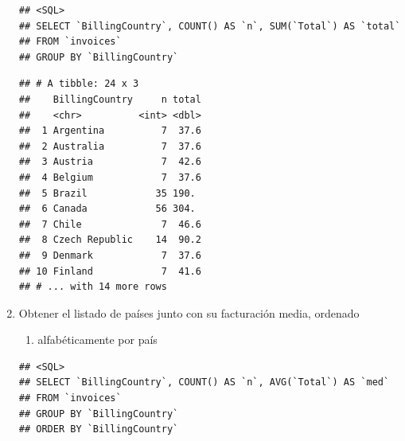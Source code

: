 \documentclass[]{book}
\newenvironment{Shaded}{\begin{snugshade}}{\end{snugshade}}
\newcommand{\KeywordTok}[1]{\textcolor[rgb]{0.13,0.29,0.53}{\textbf{#1}}}
\newcommand{\DataTypeTok}[1]{\textcolor[rgb]{0.13,0.29,0.53}{#1}}
\newcommand{\StringTok}[1]{\textcolor[rgb]{0.31,0.60,0.02}{#1}}
\newcommand{\OtherTok}[1]{\textcolor[rgb]{0.56,0.35,0.01}{#1}}
\newcommand{\OperatorTok}[1]{\textcolor[rgb]{0.81,0.36,0.00}{\textbf{#1}}}
\newcommand{\NormalTok}[1]{#1}
\providecommand{\tightlist}{%
  \setlength{\itemsep}{0pt}\setlength{\parskip}{0pt}}
\begin{document}
\begin{enumerate}
\begin{verbatim}
## <SQL>
## SELECT `BillingCountry`, COUNT() AS `n`, SUM(`Total`) AS `total`
## FROM `invoices`
## GROUP BY `BillingCountry`
\end{verbatim}

\begin{Shaded}
\end{Shaded}

\begin{verbatim}
## # A tibble: 24 x 3
##    BillingCountry     n total
##    <chr>          <int> <dbl>
##  1 Argentina          7  37.6
##  2 Australia          7  37.6
##  3 Austria            7  42.6
##  4 Belgium            7  37.6
##  5 Brazil            35 190. 
##  6 Canada            56 304. 
##  7 Chile              7  46.6
##  8 Czech Republic    14  90.2
##  9 Denmark            7  37.6
## 10 Finland            7  41.6
## # ... with 14 more rows
\end{verbatim}
\item
  Obtener el listado de países junto con su facturación media, ordenado

  \begin{enumerate}
  \def\labelenumii{(\alph{enumii})}
  \tightlist
  \item
    alfabéticamente por país
  \end{enumerate}

\begin{Shaded}
\end{Shaded}

\begin{verbatim}
## <SQL>
## SELECT `BillingCountry`, COUNT() AS `n`, AVG(`Total`) AS `med`
## FROM `invoices`
## GROUP BY `BillingCountry`
## ORDER BY `BillingCountry`
\end{verbatim}


\end{enumerate}
\end{document}
